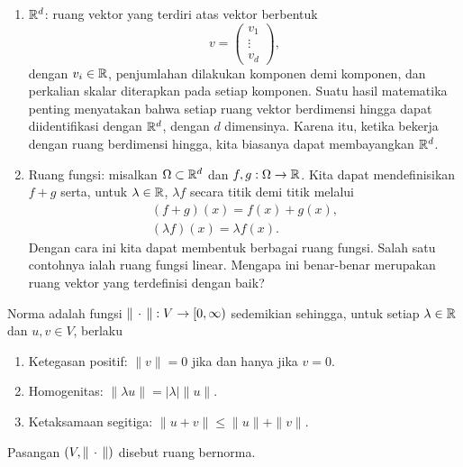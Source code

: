 \begin{example}
    \begin{enumerate}
        \item $\mathbb{R}^d$: ruang vektor yang terdiri atas vektor berbentuk
        \begin{equation}
            v=\begin{pmatrix}
                v_1\\
                \vdots\\
                v_d
            \end{pmatrix},
        \end{equation}
        dengan $v_i\in\mathbb{R}$, penjumlahan dilakukan komponen demi komponen, dan
        perkalian skalar diterapkan pada setiap komponen. Suatu hasil matematika
        penting menyatakan bahwa setiap ruang vektor berdimensi hingga dapat
        diidentifikasi dengan $\mathbb{R}^d$, dengan $d$ dimensinya. Karena itu, ketika
        bekerja dengan ruang berdimensi hingga, kita biasanya dapat membayangkan
        $\mathbb{R}^d$.

        \item Ruang fungsi: misalkan $\Omega\subset\mathbb{R}^d$ dan
        $f,g:\Omega\rightarrow\mathbb{R}$. Kita dapat mendefinisikan $f+g$ serta, untuk
        $\lambda\in\mathbb{R}$, $\lambda f$ secara titik demi titik melalui
        \begin{gather}
            (f+g)(x)=f(x)+g(x),\\
            (\lambda f)(x)=\lambda f(x).
        \end{gather}
        Dengan cara ini kita dapat membentuk berbagai ruang fungsi. Salah satu
        contohnya ialah ruang fungsi linear. Mengapa ini benar-benar merupakan
        ruang vektor yang terdefinisi dengan baik?
    \end{enumerate}
\end{example}

\begin{defn}[Norma]
    Norma adalah fungsi $\|\,\cdot\,\|:V\rightarrow[0,\infty)$ sedemikian sehingga,
    untuk setiap $\lambda\in\mathbb{R}$ dan $u,v\in V$, berlaku
    \begin{enumerate}
        \item Ketegasan positif: $\|v\|=0$ jika dan hanya jika $v=0$.
        \item Homogenitas: $\|\lambda u\|=|\lambda|\|u\|$.
        \item Ketaksamaan segitiga: $\|u+v\|\leq\|u\|+\|v\|$.
    \end{enumerate}
    Pasangan $(V,\|\,\cdot\,\|)$ disebut ruang bernorma.
\end{defn}

